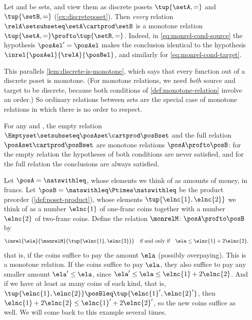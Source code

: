 \begin{example}
    \label{exa:monrel-discrete}
    Let \setA and \setB be sets, and view them as discrete posets $\tup{\setA, {{=}}}$ and $\tup{\setB, {{=}}}$ (\cref{ex:discreteposet}).
    Then \emph{every} relation $\relA \setsubseteq \setA \cartprod \setB$ is a monotone relation $\tup{\setA, {{=}}} \profto \tup{\setB, {{=}}}$.
    Indeed, in \cref{eq:monrel-cond-source} the hypothesis $\posAel' = \posAel$ makes the conclusion identical to the hypothesis $\inrel{\posAel}{\relA}{\posBel}$, and similarly for \cref{eq:monrel-cond-target}.

    This parallels \cref{lem:discrete-is-monotone}, which says that every function out of a discrete poset is monotone.
    (For monotone relations, we need \emph{both} source and target to be discrete, because both conditions of \cref{def:monotone-relation} involve an order.)
    So ordinary relations between sets are the special case of monotone relations in which there is no order to respect.
\end{example}

\begin{example}
    For any  \posA and \posB, the empty relation $\Emptyset \setsubseteq \posAset \cartprod \posBset$ and the full relation $\posAset \cartprod \posBset$ are monotone relations $\posA \profto \posB$: for the empty relation the hypotheses of both conditions are never satisfied, and for the full relation the conclusions are always satisfied.
\end{example}

\begin{example}
    \label{exa:monrel-coins}
    Let $\posA = \natswithleq$, whose elements we think of as amounts of money, in francs.
    Let $\posB = \natswithleq \Ptimes \natswithleq$ be the product preorder (\cref{def:poset-product}), whose elements $\tup{\elnc{1}, \elnc{2}}$ we think of as a number $\elnc{1}$ of one-franc coins together with a number $\elnc{2}$ of two-franc coins.
    Define the relation $\monrelM \colon \posA \profto \posB$ by
    \begin{equation}
        \inrel{\ela}{\monrelM}{\tup{\elnc{1}, \elnc{2}}}
        \quad \text{if and only if} \quad
        \ela \leq \elnc{1} + 2 \elnc{2},
    \end{equation}
    that is, if the coins suffice to pay the amount $\ela$ (possibly overpaying).
    This is a monotone relation.
    If the coins suffice to pay $\ela$, they also suffice to pay any smaller amount $\ela' \leq \ela$, since $\ela' \leq \ela \leq \elnc{1} + 2 \elnc{2}$.
    And if we have at least as many coins of each kind, that is, $\tup{\elnc{1}, \elnc{2}} \posBleq \tup{\elnc{1}', \elnc{2}'}$, then $\elnc{1} + 2\elnc{2} \leq \elnc{1}' + 2\elnc{2}'$, so the new coins suffice as well.
    We will come back to this example several times.
\end{example}

